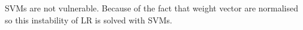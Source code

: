 \begin{answer}
\\ \\
SVMs are not vulnerable. Because of the fact that weight vector are normalised so this instability of LR is solved with SVMs.
\\ \\
\end{answer}
